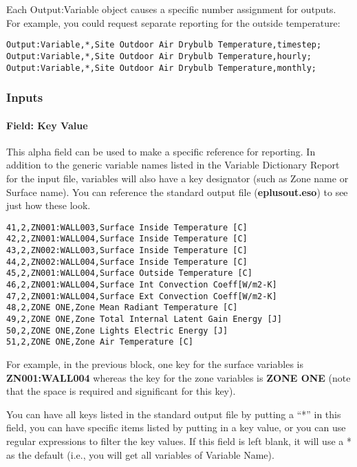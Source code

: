 Each Output:Variable object causes a specific number assignment for outputs. For example, you could request separate reporting for the outside temperature:

\begin{lstlisting}
Output:Variable,*,Site Outdoor Air Drybulb Temperature,timestep;
Output:Variable,*,Site Outdoor Air Drybulb Temperature,hourly;
Output:Variable,*,Site Outdoor Air Drybulb Temperature,monthly;
\end{lstlisting}

\subsubsection{Inputs}\label{inputs-8-019}

\paragraph{Field: Key Value}\label{field-key-value}

This alpha field can be used to make a specific reference for reporting. In addition to the generic variable names listed in the Variable Dictionary Report for the input file, variables will also have a key designator (such as Zone name or Surface name). You can reference the standard output file (\textbf{eplusout.eso}) to see just how these look.

\begin{lstlisting}
41,2,ZN001:WALL003,Surface Inside Temperature [C]
42,2,ZN001:WALL004,Surface Inside Temperature [C]
43,2,ZN002:WALL003,Surface Inside Temperature [C]
44,2,ZN002:WALL004,Surface Inside Temperature [C]
45,2,ZN001:WALL004,Surface Outside Temperature [C]
46,2,ZN001:WALL004,Surface Int Convection Coeff[W/m2-K]
47,2,ZN001:WALL004,Surface Ext Convection Coeff[W/m2-K]
48,2,ZONE ONE,Zone Mean Radiant Temperature [C]
49,2,ZONE ONE,Zone Total Internal Latent Gain Energy [J]
50,2,ZONE ONE,Zone Lights Electric Energy [J]
51,2,ZONE ONE,Zone Air Temperature [C]
\end{lstlisting}

For example, in the previous block, one key for the surface variables is \textbf{ZN001:WALL004} whereas the key for the zone variables is \textbf{ZONE ONE} (note that the space is required and significant for this key).

You can have all keys listed in the standard output file by putting a ``*'' in this field, you can have specific items listed by putting in a key value, or you can use regular expressions to filter the key values. If this field is left blank, it will use a * as the default (i.e., you will get all variables of Variable Name).

